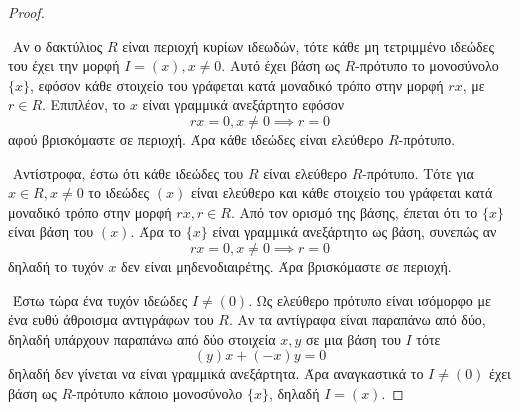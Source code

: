 \documentclass[oneside,a4paper]{article}
\begin{document}
\begin{proof} $ $

	$ $\newline
	Αν ο δακτύλιος $R$ είναι περιοχή κυρίων ιδεωδών, τότε κάθε μη τετριμμένο ιδεώδες του έχει την μορφή $I=(x), x\neq 0$. Αυτό έχει βάση ως $R$-πρότυπο το μονοσύνολο $\{x\}$, εφόσον κάθε στοιχείο του γράφεται κατά μοναδικό τρόπο στην μορφή $rx$, με $r \in R$. Επιπλέον, το $x$ είναι γραμμικά ανεξάρτητο εφόσον $$rx = 0, x\neq 0 \implies r = 0$$ αφού βρισκόμαστε σε περιοχή. Άρα κάθε ιδεώδες είναι ελεύθερο $R$-πρότυπο.

	$ $\newline
	Αντίστροφα, έστω ότι κάθε ιδεώδες του $R$ είναι ελεύθερο $R$-πρότυπο. Τότε για $x \in R, x\neq 0$ το ιδεώδες $(x)$ είναι ελεύθερο και κάθε στοιχείο του γράφεται κατά μοναδικό τρόπο στην μορφή $rx, r\in R$. Aπό τον ορισμό της βάσης, έπεται ότι το $\{x\}$ είναι βάση του $(x)$. Άρα το $\{x\}$ είναι γραμμικά ανεξάρτητο ως βάση, συνεπώς αν $$rx = 0, x\neq 0 \implies r = 0$$ δηλαδή το τυχόν $x$ δεν είναι μηδενοδιαιρέτης. Άρα βρισκόμαστε σε περιοχή.

	$ $\newline
	Έστω τώρα ένα τυχόν ιδεώδες $I \neq (0)$. Ως ελεύθερο πρότυπο είναι ισόμορφο με ένα ευθύ άθροισμα αντιγράφων του $R$. Αν τα αντίγραφα είναι παραπάνω από δύο, δηλαδή υπάρχουν παραπάνω από δύο στοιχεία $x,y$ σε μια βάση του $I$ τότε $$(y)x + (-x)y = 0$$ δηλαδή δεν γίνεται να είναι γραμμικά ανεξάρτητα. Άρα αναγκαστικά το $I\neq (0)$ έχει βάση ως $R$-πρότυπο κάποιο μονοσύνολο $\{x\}$, δηλαδή $I=(x)$.

\end{proof}
\end{document}
